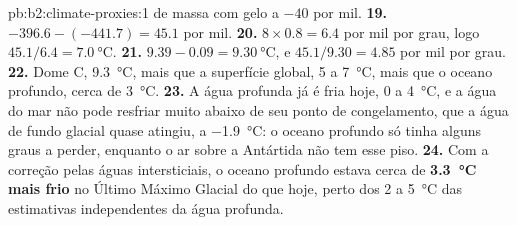 \begin{solution}{pb:b2:climate-proxies:1}
de massa com gelo a $-40$ por mil.
\textbf{19.} $-396.6 - (-441.7) = 45.1$ por mil.
\textbf{20.} $8 \times 0.8 = 6.4$ por mil por grau, logo $45.1/6.4 = \qty{7.0}{\celsius}$.
\textbf{21.} $9.39 - 0.09 = \qty{9.30}{\celsius}$, e $45.1/9.30 = 4.85$ por mil por grau.
\textbf{22.} Dome C, \qty{9.3}{\celsius}, mais que a superfície global, 5 a \qty{7}{\celsius}, mais
que o oceano profundo, cerca de \qty{3}{\celsius}.
\textbf{23.} A água profunda já é fria hoje, 0 a \qty{4}{\celsius}, e a água do mar não pode
resfriar muito abaixo de seu ponto de congelamento, que a água de fundo glacial quase atingiu, a
\qty{-1.9}{\celsius}: o oceano profundo só tinha alguns graus a perder, enquanto o ar sobre a Antártida
não tem esse piso.
\textbf{24.} Com a correção pelas águas intersticiais, o oceano profundo estava cerca de \textbf{\qty{3.3}{\celsius}
mais frio} no Último Máximo Glacial do que hoje, perto dos 2 a \qty{5}{\celsius} das estimativas
independentes da água profunda.
\end{solution}
